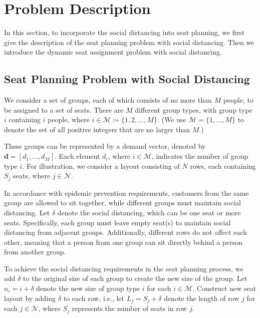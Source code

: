 \section{Problem Description}
In this section, to incorporate the social distancing into seat planning, we first give the description of the seat planning problem with social distancing. Then we introduce the dynamic seat assignment problem with social distancing.


\subsection{Seat Planning Problem with Social Distancing}\label{dynamic_demand}
We consider a set of groups, each of which consists of no more than $M$ people, to be assigned to a set of seats. There are $M$ different group types, with group type $i$ containing $i$ people, where $i \in \mathcal{M} \coloneqq \{1,2, \ldots, M\}$. (We use $\mathcal{M} = \{1, \ldots, M\}$ to denote the set of all positive integers that are no larger than $M$.)

These groups can be represented by a demand vector, denoted by $\mathbf{d} = [d_1, \ldots, d_M]$. Each element $d_i$, where $i \in \mathcal{M}$, indicates the number of group type $i$. For illustration, we consider a layout consisting of $N$ rows, each containing $S_j$ seats, where $j \in \mathcal{N}$.

In accordance with epidemic prevention requirements, customers from the same group are allowed to sit together, while different groups must maintain social distancing. Let $\delta$ denote the social distancing, which can be one seat or more seats. Specifically, each group must leave empty seat(s) to maintain social distancing from adjacent groups. Additionally, different rows do not affect each other, meaning that a person from one group can sit directly behind a person from another group.


To achieve the social distancing requirements in the seat planning process, we add $\delta$ to the original size of each group to create the new size of the group. Let $n_i = i + \delta$ denote the new size of group type $i$ for each $i \in \mathcal{M}$. Construct new seat layout by adding $\delta$ to each row, i.e., let $L_j = S_j + \delta$ denote the length of row $j$ for each $j \in \mathcal{N}$, where $S_j$ represents the number of seats in row $j$.


